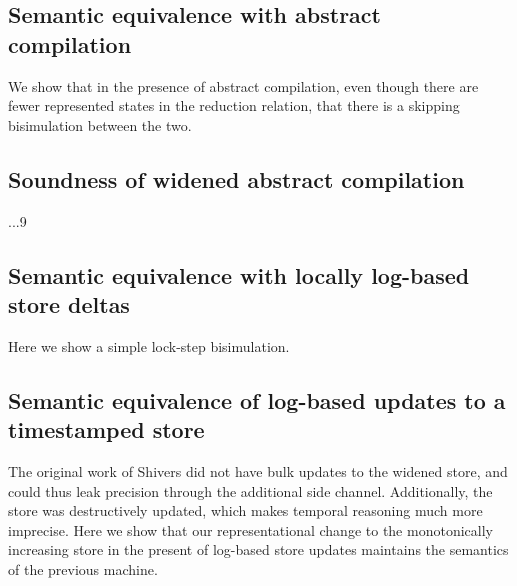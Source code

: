 \documentclass{llncs}
\begin{document}
\subsection{Semantic equivalence with abstract compilation}

We show that in the presence of abstract compilation, even though
there are fewer represented states in the reduction relation, that
there is a skipping bisimulation between the two.

\subsection{Soundness of widened abstract compilation}

...9

\subsection{Semantic equivalence with locally log-based store deltas}

Here we show a simple lock-step bisimulation.

\subsection{Semantic equivalence of log-based updates to a timestamped store}
The original work of Shivers did not have bulk updates to the widened
store, and could thus leak precision through the additional side
channel. Additionally, the store was destructively updated, which
makes temporal reasoning much more imprecise. Here we show that our
representational change to the monotonically increasing store in the
present of log-based store updates maintains the semantics of the previous machine.
\end{document}

